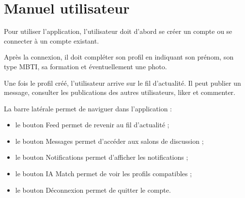 \documentclass[a4paper, 12pt, twoside]{article}
\begin{document}
\section{Manuel utilisateur}

Pour utiliser l'application, l'utilisateur doit d'abord se créer un compte ou se connecter à un compte existant.

Après la connexion, il doit compléter son profil en indiquant son prénom, son type MBTI, sa formation et éventuellement une photo.

Une fois le profil créé, l'utilisateur arrive sur le fil d'actualité. 
Il peut publier un message, consulter les publications des autres utilisateurs, liker et commenter.

La barre latérale permet de naviguer dans l'application :

\begin{itemize}
    \item le bouton Feed permet de revenir au fil d'actualité ;
    \item le bouton Messages permet d'accéder aux salons de discussion ;
    \item le bouton Notifications permet d'afficher les notifications ;
    \item le bouton IA Match permet de voir les profils compatibles ;
    \item le bouton Déconnexion permet de quitter le compte.
\end{itemize}
\end{document}

